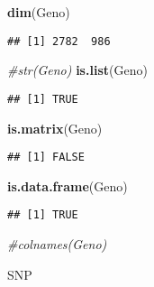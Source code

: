 \documentclass[]{article}
\newenvironment{Shaded}{\begin{snugshade}}{\end{snugshade}}
\newcommand{\KeywordTok}[1]{\textcolor[rgb]{0.13,0.29,0.53}{\textbf{#1}}}
\newcommand{\CommentTok}[1]{\textcolor[rgb]{0.56,0.35,0.01}{\textit{#1}}}
\newcommand{\NormalTok}[1]{#1}
\begin{document}
\begin{Shaded}
\begin{Highlighting}[]
\KeywordTok{dim}\NormalTok{(Geno)}
\end{Highlighting}
\end{Shaded}

\begin{verbatim}
## [1] 2782  986
\end{verbatim}

\begin{Shaded}
\begin{Highlighting}[]
\CommentTok{#str(Geno)}
\KeywordTok{is.list}\NormalTok{(Geno)}
\end{Highlighting}
\end{Shaded}

\begin{verbatim}
## [1] TRUE
\end{verbatim}

\begin{Shaded}
\begin{Highlighting}[]
\KeywordTok{is.matrix}\NormalTok{(Geno)}
\end{Highlighting}
\end{Shaded}

\begin{verbatim}
## [1] FALSE
\end{verbatim}

\begin{Shaded}
\begin{Highlighting}[]
\KeywordTok{is.data.frame}\NormalTok{(Geno)}
\end{Highlighting}
\end{Shaded}

\begin{verbatim}
## [1] TRUE
\end{verbatim}

\begin{Shaded}
\begin{Highlighting}[]
\CommentTok{#colnames(Geno)}

\NormalTok{SNP}
\end{Highlighting}
\end{Shaded}
\end{document}
